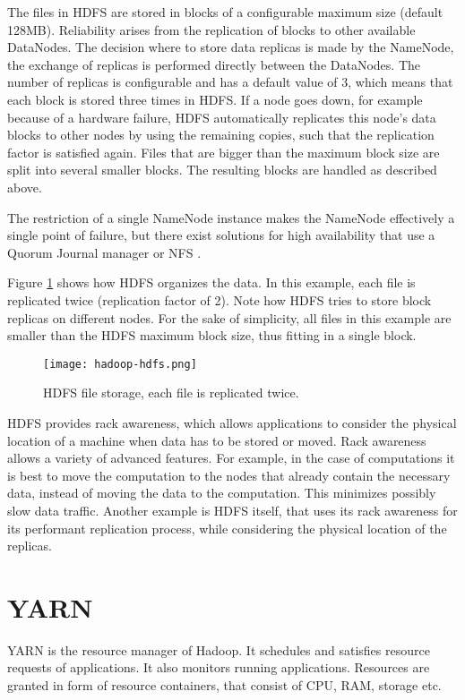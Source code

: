 The files in HDFS are stored in blocks of a configurable maximum size (default 128MB). Reliability arises from the replication of blocks to other available DataNodes. The decision where to store data replicas is made by the NameNode, the exchange of replicas is performed directly between the DataNodes. The number of replicas is configurable and has a default value of 3, which means that each block is stored three times in HDFS. If a node goes down, for example because of a hardware failure, HDFS automatically replicates this node's data blocks to other nodes by using the remaining copies, such that the replication factor is satisfied again. Files that are bigger than the maximum block size are split into several smaller blocks. The resulting blocks are handled as described above.

The restriction of a single NameNode instance makes the NameNode effectively a single point of failure, but there exist solutions for high availability that use a Quorum Journal manager \cite{hdfs-ha-qjm} or NFS \cite{hdfs-ha-nfs}.

Figure \ref{fig:hadoop-hdfs} shows how HDFS organizes the data. In this example, each file is replicated twice (replication factor of 2). Note how HDFS tries to store block replicas on different nodes. For the sake of simplicity, all files in this example are smaller than the HDFS maximum block size, thus fitting in a single block.

\begin{figure}[ht!]
  \centering
  \texttt{[image: hadoop-hdfs.png]}
  \caption{HDFS file storage, each file is replicated twice.}
  \label{fig:hadoop-hdfs}
\end{figure}

HDFS provides rack awareness, which allows applications to consider the physical location of a machine when data has to be stored or moved. Rack awareness allows a variety of advanced features. For example, in the case of computations it is best to move the computation to the nodes that already contain the necessary data, instead of moving the data to the computation. This minimizes possibly slow data traffic. Another example is HDFS itself, that uses its rack awareness for its performant replication process, while considering the physical location of the replicas.

\section{YARN}
\label{chap:hadoop:yarn}
YARN is the resource manager of Hadoop. It schedules and satisfies resource requests of applications. It also monitors running applications. Resources are granted in form of resource containers, that consist of CPU, RAM, storage etc.

